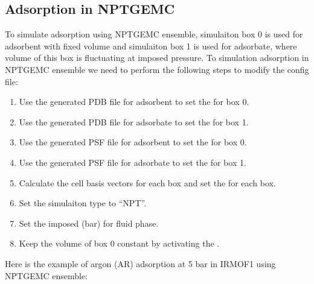 \documentclass[letterpaper,10pt,english]{sphinxmanual}
\begin{document}
\subsection{Adsorption in NPT\sphinxhyphen{}GEMC}
\label{\detokenize{howto:adsorption-in-npt-gemc}}
\sphinxAtStartPar
To simulate adsorption using NPT\sphinxhyphen{}GEMC ensemble, simulaiton box 0 is used for adsorbent with fixed volume and simulaiton box 1 is used for adsorbate, where
volume of this box is fluctuating at imposed pressure. To simulation adsorption in NPT\sphinxhyphen{}GEMC ensemble we need to perform the following steps to modify the
config file:
\begin{enumerate}
%
\item {} 
\sphinxAtStartPar
Use the generated PDB file for adsorbent to set the  for box 0.

\item {} 
\sphinxAtStartPar
Use the generated PDB file for adsorbate to set the  for box 1.

\item {} 
\sphinxAtStartPar
Use the generated PSF file for adsorbent to set the  for box 0.

\item {} 
\sphinxAtStartPar
Use the generated PSF file for adsorbate to set the  for box 1.

\item {} 
\sphinxAtStartPar
Calculate the cell basis vectors for each box and set the  for each box.

\item {} 
\sphinxAtStartPar
Set the  simulaiton type to “NPT”.

\item {} 
\sphinxAtStartPar
Set the imposed  (bar) for fluid phase.

\item {} 
\sphinxAtStartPar
Keep the volume of box 0 constant by activating the .

\end{enumerate}

\sphinxAtStartPar
Here is the example of argon (AR) adsorption at 5 bar in IRMOF\sphinxhyphen{}1 using NPT\sphinxhyphen{}GEMC ensemble:
\end{document}
